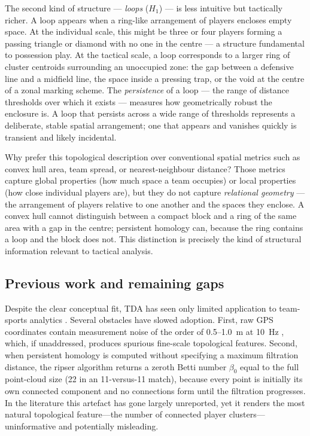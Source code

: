 \documentclass[11pt,a4paper]{article}
\begin{document}
The second kind of structure --- \emph{loops} (\(H_1\)) ---
is less intuitive but tactically richer.  A loop appears when
a ring-like arrangement of players encloses empty space.  At
the individual scale, this might be three or four players
forming a passing triangle or diamond with no one in the
centre --- a structure fundamental to possession play.  At the
tactical scale, a loop corresponds to a larger ring of cluster
centroids surrounding an unoccupied zone: the gap between a
defensive line and a midfield line, the space inside a
pressing trap, or the void at the centre of a zonal marking
scheme.  The \emph{persistence} of a loop --- the range of
distance thresholds over which it exists --- measures how
geometrically robust the enclosure is.  A loop that persists
across a wide range of thresholds represents a deliberate,
stable spatial arrangement; one that appears and vanishes
quickly is transient and likely incidental.

Why prefer this topological description over conventional
spatial metrics such as convex hull area, team spread, or
nearest-neighbour distance?  Those metrics capture global
properties (how much space a team occupies) or local
properties (how close individual players are), but they do not
capture \emph{relational geometry} --- the arrangement of
players relative to one another and the spaces they enclose.
A convex hull cannot distinguish between a compact block and a
ring of the same area with a gap in the centre; persistent
homology can, because the ring contains a loop and the block
does not.  This distinction is precisely the kind of
structural information relevant to tactical analysis.

\subsection{Previous work and remaining gaps}

Despite the clear conceptual fit, TDA has seen only limited
application to team-sports analytics
\citep{Gudmundsson2017,Buldu2019}.  Several obstacles have
slowed adoption.  First, raw GPS coordinates contain
measurement noise of the order of 0.5--1.0~m at 10~Hz
\citep{Aughey2011}, which, if unaddressed, produces
spurious fine-scale topological features.  Second, when
persistent homology is computed without specifying a maximum
filtration distance, the ripser algorithm returns a zeroth
Betti number \(\beta_0\) equal to the full point-cloud size
(22 in an 11-versus-11 match), because every point is
initially its own connected component and no connections
form until the filtration progresses.  In the literature
this artefact has gone largely unreported, yet it renders
the most natural topological feature---the number of
connected player clusters---uninformative and potentially
misleading.
\end{document}
